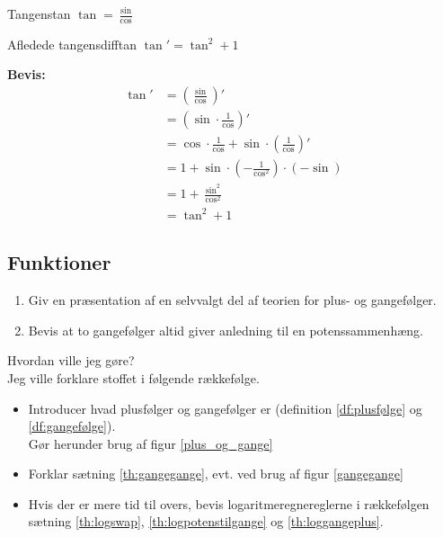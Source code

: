 \documentclass{article}
\begin{document}
\begin{lemma}{Tangens}{tan}
	\(
		\tan = \frac{\sin}{\cos}
	\) 
\end{lemma}

\begin{theorem}{Afledede tangens}{difftan}
	\(
		\tan' = \tan^2 + 1
	\) 
\end{theorem}

\textbf{Bevis:}
\begin{align*}
	\tan' &= \left(\frac{\sin}{\cos}\right)'\\
		  &= \left(\sin \cdot \frac{1}{\cos}\right)'\\
		  &= \cos \cdot \frac{1}{\cos} + \sin \cdot \left(\frac{1}{\cos}\right)'\\
		  &= 1 + \sin \cdot \left(-\frac{1}{\cos^2}\right) \cdot (-\sin)\\
		  &= 1 + \frac{\sin^2}{\cos^2}\\
		  &= \tan^2 + 1
\end{align*}

\begin{tcolorbox}
	\section{Funktioner}
	\tcblower
	\begin{enumerate}
		\item Giv en præsentation af en selvvalgt del af teorien for plus- og gangefølger.
		\item Bevis at to gangefølger altid giver anledning til en potenssammenhæng.
	\end{enumerate}
\end{tcolorbox}

\begin{eksempel*}{Hvordan ville jeg gøre?}{}\\
	Jeg ville forklare stoffet i følgende rækkefølge.
	\begin{itemize}
		\item Introducer hvad plusfølger og gangefølger er 
			(definition \ref{df:plusfølge} og \ref{df:gangefølge}).\\
			Gør herunder brug af figur \ref{plus_og_gange} %
		\item Forklar sætning \ref{th:gangegange}, evt. ved brug af figur \ref{gangegange}
		\item Hvis der er mere tid til overs, bevis logaritmeregnereglerne i rækkefølgen
			sætning \ref{th:logswap}, \ref{th:logpotenstilgange} og \ref{th:loggangeplus}.
	\end{itemize}
\end{eksempel*}
\end{document}
